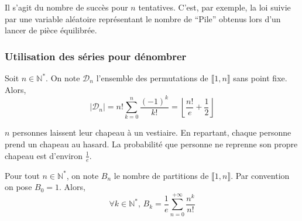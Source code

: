   \begin{remark}
    Il s'agit du nombre de succès pour $n$ tentatives.
    \newpar
    C'est, par exemple, la loi suivie par une variable aléatoire représentant le nombre de ``Pile'' obtenus lors d'un lancer de pièce équilibrée.
  \end{remark}
  
  \subsubsection{Utilisation des séries pour dénombrer}
  
  
  \begin{theorem}[Dérangements]
    Soit $n \in \mathbb{N}^*$. On note $\mathcal{D}_n$ l'ensemble des permutations de $\llbracket 1, n \rrbracket$ sans point fixe. Alors,
    \[ \vert \mathcal{D}_n \vert = n! \sum_{k=0}^{n} \frac{(-1)^k}{k!} = \left\lfloor \frac{n!}{e} + \frac{1}{2} \right\rfloor \]
  \end{theorem}
  
  \begin{example}
    $n$ personnes laissent leur chapeau à un vestiaire. En repartant, chaque personne prend un chapeau au hasard. La probabilité que personne ne reprenne son propre chapeau est d'environ $\frac{1}{e}$.
  \end{example}
  
  
  \begin{theorem}
    Pour tout $n \in \mathbb{N}^*$, on note $B_n$ le nombre de partitions de $\llbracket 1, n \rrbracket$. Par convention on pose $B_0 = 1$. Alors,
    \[ \forall k \in \mathbb{N}^*, \, B_k = \frac{1}{e} \sum_{n=0}^{+\infty} \frac{n^k}{n!} \]
  \end{theorem}


